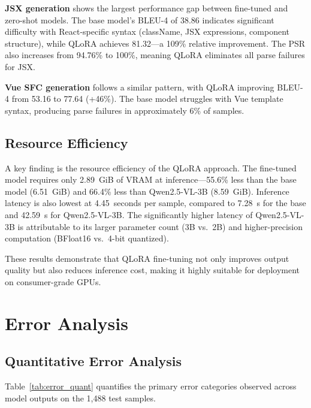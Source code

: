 \textbf{JSX generation} shows the largest performance gap between fine-tuned and zero-shot models. The base model's BLEU-4 of 38.86 indicates significant difficulty with React-specific syntax (className, JSX expressions, component structure), while QLoRA achieves 81.32—a 109\% relative improvement. The PSR also increases from 94.76\% to 100\%, meaning QLoRA eliminates all parse failures for JSX.

\textbf{Vue SFC generation} follows a similar pattern, with QLoRA improving BLEU-4 from 53.16 to 77.64 (+46\%). The base model struggles with Vue template syntax, producing parse failures in approximately 6\% of samples.

\subsection{Resource Efficiency}

A key finding is the resource efficiency of the QLoRA approach. The fine-tuned model requires only 2.89~GiB of VRAM at inference—55.6\% less than the base model (6.51~GiB) and 66.4\% less than Qwen2.5-VL-3B (8.59~GiB). Inference latency is also lowest at 4.45~seconds per sample, compared to 7.28~s for the base and 42.59~s for Qwen2.5-VL-3B. The significantly higher latency of Qwen2.5-VL-3B is attributable to its larger parameter count (3B vs.\ 2B) and higher-precision computation (BFloat16 vs.\ 4-bit quantized).

These results demonstrate that QLoRA fine-tuning not only improves output quality but also reduces inference cost, making it highly suitable for deployment on consumer-grade GPUs.


\section{Error Analysis}

\subsection{Quantitative Error Analysis}

Table~\ref{tab:error_quant} quantifies the primary error categories observed across model outputs on the 1,488 test samples.

